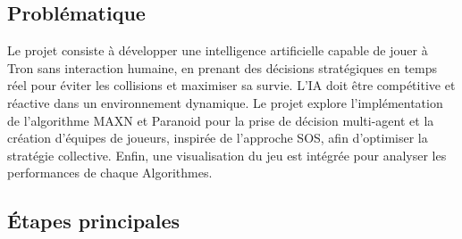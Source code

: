 \documentclass[a4paper,12pt]{article}
\begin{document}
\subsection{Problématique}
Le projet consiste à développer une intelligence artificielle capable de jouer à Tron sans interaction humaine, en prenant des décisions stratégiques en temps réel pour éviter les collisions et maximiser sa survie. L’IA doit être compétitive et réactive dans un environnement dynamique. Le projet explore l'implémentation de l'algorithme MAXN et Paranoid pour la prise de décision multi-agent et la création d'équipes de joueurs, inspirée de l'approche SOS, afin d'optimiser la stratégie collective. Enfin, une visualisation du jeu est intégrée pour analyser les performances de chaque Algorithmes.

\subsection{Étapes principales}
\end{document}
